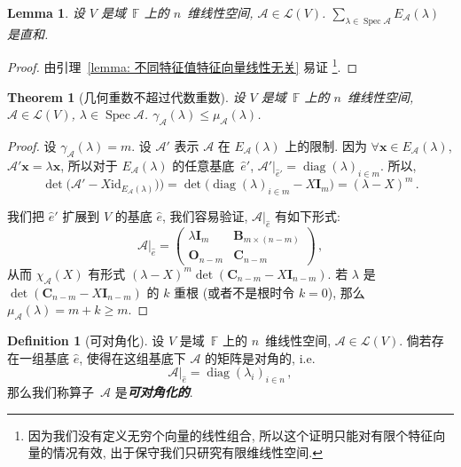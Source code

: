 \documentclass[openany]{ctexbook}
\newcommand*{\indexbf}[1]{\emph{\textbf{#1}}\index{#1}} %
\theoremstyle{plain}
\newtheorem{theorem}{Theorem}[section] %
\newtheorem{lemma}{Lemma} %
\theoremstyle{definition}
\newtheorem{definition}{Definition}[section] %
\newcommand*{\bv}{\boldsymbol} %
\newcommand*{\id}{\mathrm{id}} %
\newcommand*{\inbasis}[2]{\left.%
	{#1}\right|_{#2}
}
\DeclareMathOperator{\diag}{diag}
\DeclareMathOperator{\Spec}{Spec}
\begin{document}
\begin{lemma}\label{lemma: 特征子空间之和是直和}
	设 $V$ 是域~$\mathbb F$ 上的 $n$~维线性空间, $\mathscr A \in \mathcal L(V)$. $\sum_{\lambda \in \Spec \mathscr A} E_\mathscr A(\lambda)$ 是直和.
\end{lemma}
\begin{proof}
	由引理~\ref{lemma: 不同特征值特征向量线性无关} 易证%
		\footnote{因为我们没有定义无穷个向量的线性组合, 所以这个证明只能对有限个特征向量的情况有效, 出于保守我们只研究有限维线性空间.}. 
\end{proof}

\begin{theorem}[几何重数不超过代数重数]\label{theorem: 几何重数不超过代数重数}
	设 $V$ 是域~$\mathbb F$ 上的 $n$~维线性空间, $\mathscr A \in \mathcal L(V)$,  $\lambda \in \Spec \mathscr A$. $\gamma_\mathscr A(\lambda) \leq \mu_\mathscr A (\lambda)$.
\end{theorem}
\begin{proof}
	设 $\gamma_\mathscr A(\lambda) = m$. 设 $\mathscr A'$ 表示 $\mathscr A$ 在 $E_\mathscr A(\lambda)$ 上的限制. 
	因为 $\forall \bv x \in E_\mathscr A(\lambda)$, $\mathscr A' \bv x = \lambda \bv x$, 所以对于 $E_\mathscr A(\lambda)$ 的任意基底~$\hat e'$, $\inbasis{\mathscr A'}{\hat e'} = \diag(\lambda)_{i \in m}$.
	所以, 
	\begin{equation*}
		\det \big(  \mathscr A' - X\id_{E_\mathscr A(\lambda)}) \big)
			= \det \big( \diag(\lambda)_{i \in m} - X \bv I_m\big)
			= (\lambda - X)^m \,.
	\end{equation*}

	我们把 $\hat e'$ 扩展到 $V$ 的基底 $\hat e$, 我们容易验证, $\inbasis{\mathscr A}{\hat e}$ 有如下形式:
	\begin{equation*}
		\inbasis{\mathscr A}{\hat e} = 
		\begin{pmatrix}
			\lambda \bv I_m & \bv B_{m \times (n - m)} \\
			\bv O_{n - m} & \bv C_{n - m}
		\end{pmatrix}\,, 
	\end{equation*}
	从而 $\chi_\mathscr A(X)$ 有形式 $(\lambda - X)^m \det (\bv C_{n - m} - X \bv I_{n - m})$. 
	若 $\lambda$ 是 $\det (\bv C_{n - m} - X \bv I_{n - m})$ 的 $k$ 重根 (或者不是根时令 $k = 0$), 那么 $\mu_\mathscr A(\lambda) = m + k \geq m$.
\end{proof}

\begin{definition}[可对角化]
	设 $V$ 是域~$\mathbb F$ 上的 $n$~维线性空间, $\mathscr A \in \mathcal L(V)$.
	倘若存在一组基底 $\hat e$, 使得在这组基底下 $\mathscr A$ 的矩阵是对角的, i.e.\ 
	\begin{equation*}
		\inbasis{\mathscr A}{\hat e} = \diag (\lambda_i)_{i \in n} \,,
	\end{equation*}
	那么我们称算子~$\mathscr A$ 是\indexbf{可对角化的}.
\end{definition}
\end{document}
